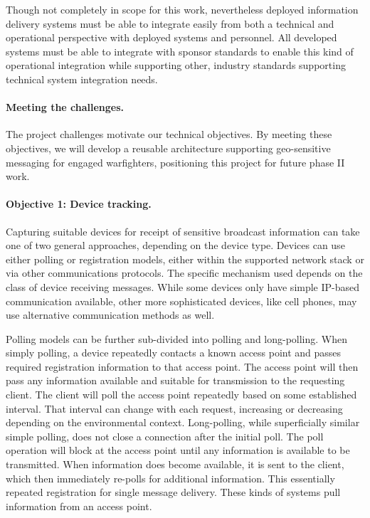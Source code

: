 \documentclass{sbir}
\begin{document}
Though not completely in scope for this work, nevertheless deployed information delivery systems must be able to integrate easily from both a technical and operational perspective with deployed systems and personnel.  All developed systems must be able to integrate with sponsor standards to enable this kind of operational integration while supporting other, industry standards supporting technical system integration needs.

\paragraph{Meeting the challenges.}  

{The project challenges motivate our technical objectives.  By meeting these objectives, we will develop a reusable architecture supporting geo-sensitive messaging for engaged warfighters, positioning this project for future phase II work.}

\paragraph{Objective 1: Device tracking.} Capturing suitable devices for receipt of sensitive broadcast information can take one of two general approaches, depending on the device type.  Devices can use either polling or registration models, either within the supported network stack or via other communications protocols.  The specific mechanism used depends on the class of device receiving messages.  While some devices only have simple IP-based communication available, other more sophisticated devices, like cell phones, may use alternative communication methods as well.

Polling models can be further sub-divided into polling and long-polling.  When simply polling, a device repeatedly contacts a known access point and passes required registration information to that access point.  The access point will then pass any information available and suitable for transmission to the requesting client.  The client will poll the access point repeatedly based on some established interval. That interval can change with each request, increasing or decreasing depending on the environmental context.   Long-polling, while superficially similar simple polling, does not close a connection after the initial poll.  The poll operation will block at the access point until any information is available to be transmitted.  When information does become available, it is sent to the client, which then immediately re-polls for additional information.  This essentially repeated registration for single message delivery.  These kinds of systems  pull information from an access point.
\end{document}
